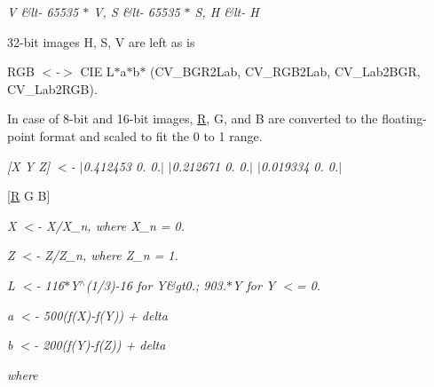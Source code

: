 {\itshape V \&lt-\/ 65535 $\ast$ V, S \&lt-\/ 65535 $\ast$ S, H \&lt-\/ H}


\begin{DoxyItemize}
\item 32-\/bit images H, S, V are left as is 
\item R\+GB {\itshape $<$-\/$>$} C\+IE L$\ast$a$\ast$b$\ast$ ({\ttfamily C\+V\+\_\+\+B\+G\+R2\+Lab, C\+V\+\_\+\+R\+G\+B2\+Lab, C\+V\+\_\+\+Lab2\+B\+GR, C\+V\+\_\+\+Lab2\+R\+GB}). 
\end{DoxyItemize}

In case of 8-\/bit and 16-\/bit images, \mbox{\hyperlink{classorg_1_1opencv_1_1_r}{R}}, G, and B are converted to the floating-\/point format and scaled to fit the 0 to 1 range.

{\itshape \mbox{[}X Y Z\mbox{]} $<$-\/ $\vert$0.412453 0. 0.$\vert$ $\vert$0.212671 0. 0.$\vert$ $\vert$0.019334 0. 0.$\vert$}

{\itshape  
\begin{DoxyItemize}
\item \mbox{[}\mbox{\hyperlink{classorg_1_1opencv_1_1_r}{R}} G B\mbox{]}


\end{DoxyItemize}}

{\itshape }

{\itshape {\itshape X $<$-\/ X/\+X\+\_\+n, where X\+\_\+n = 0.}}

{\itshape }

{\itshape }

{\itshape {\itshape Z $<$-\/ Z/\+Z\+\_\+n, where Z\+\_\+n = 1.}}

{\itshape }

{\itshape }

{\itshape {\itshape L $<$-\/ 116$\ast$\+Y$^\wedge$(1/3)-\/16 for Y\&gt0.; 903.$\ast$Y for Y $<$= 0.}}

{\itshape }

{\itshape }

{\itshape {\itshape a $<$-\/ 500(f(\+X)-\/f(Y)) + delta}}

{\itshape }

{\itshape }

{\itshape {\itshape b $<$-\/ 200(f(\+Y)-\/f(Z)) + delta}}

{\itshape }

{\itshape }

{\itshape where}

{\itshape }

